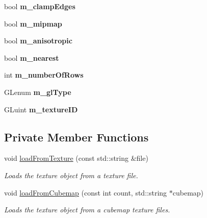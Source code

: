 \begin{DoxyCompactItemize}
bool {\bfseries m\+\_\+clamp\+Edges}
\item 
\mbox{\label{classflounder_1_1texture_a54639365a71391cc144fe4ebeaf1e39c}} 
bool {\bfseries m\+\_\+mipmap}
\item 
\mbox{\label{classflounder_1_1texture_a68c7e5491756ff6d61195dcc0e19da3b}} 
bool {\bfseries m\+\_\+anisotropic}
\item 
\mbox{\label{classflounder_1_1texture_a13c3515a014252220abfbf8c302e195b}} 
bool {\bfseries m\+\_\+nearest}
\item 
\mbox{\label{classflounder_1_1texture_af1e32e208f02390ec44941e989b5fca8}} 
int {\bfseries m\+\_\+number\+Of\+Rows}
\item 
\mbox{\label{classflounder_1_1texture_a3d36cadbf7f7aa9d8e2d8b9ffc2a267c}} 
G\+Lenum {\bfseries m\+\_\+gl\+Type}
\item 
\mbox{\label{classflounder_1_1texture_a0ad04565d8bacdc63a49076e7e0de5f2}} 
G\+Luint {\bfseries m\+\_\+texture\+ID}
\end{DoxyCompactItemize}
\subsection*{Private Member Functions}
\begin{DoxyCompactItemize}
\item 
void \hyperlink{classflounder_1_1texture_a4709b913a032bdcc66e309d39254e923}{load\+From\+Texture} (const std\+::string \&file)
\begin{DoxyCompactList}\small\item\em Loads the texture object from a texture file. \end{DoxyCompactList}\item 
void \hyperlink{classflounder_1_1texture_aa9703d5d5d76227387a0edfd28503238}{load\+From\+Cubemap} (const int count, std\+::string $\ast$cubemap)
\begin{DoxyCompactList}\small\item\em Loads the texture object from a cubemap texture files. \end{DoxyCompactList}\end{DoxyCompactItemize}


